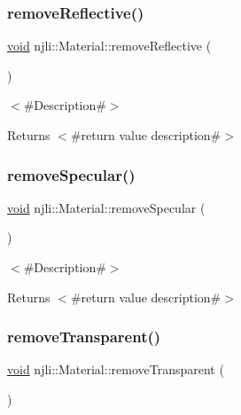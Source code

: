 \subsubsection{\texorpdfstring{remove\+Reflective()}{removeReflective()}}
{\footnotesize\ttfamily \mbox{\hyperlink{_thread_8h_af1e856da2e658414cb2456cb6f7ebc66}{void}} njli\+::\+Material\+::remove\+Reflective (\begin{DoxyParamCaption}{ }\end{DoxyParamCaption})\hspace{0.3cm}{\ttfamily [protected]}}

$<$\#\+Description\#$>$

\begin{DoxyReturn}{Returns}
$<$\#return value description\#$>$ 
\end{DoxyReturn}
\mbox{\label{classnjli_1_1_material_ad10e910fba799bdc8045470161777540}} 
\subsubsection{\texorpdfstring{remove\+Specular()}{removeSpecular()}}
{\footnotesize\ttfamily \mbox{\hyperlink{_thread_8h_af1e856da2e658414cb2456cb6f7ebc66}{void}} njli\+::\+Material\+::remove\+Specular (\begin{DoxyParamCaption}{ }\end{DoxyParamCaption})\hspace{0.3cm}{\ttfamily [protected]}}

$<$\#\+Description\#$>$

\begin{DoxyReturn}{Returns}
$<$\#return value description\#$>$ 
\end{DoxyReturn}
\mbox{\label{classnjli_1_1_material_aca74a247496651560b87a4513f8efa0c}} 
\subsubsection{\texorpdfstring{remove\+Transparent()}{removeTransparent()}}
{\footnotesize\ttfamily \mbox{\hyperlink{_thread_8h_af1e856da2e658414cb2456cb6f7ebc66}{void}} njli\+::\+Material\+::remove\+Transparent (\begin{DoxyParamCaption}{ }\end{DoxyParamCaption})\hspace{0.3cm}{\ttfamily [protected]}}


